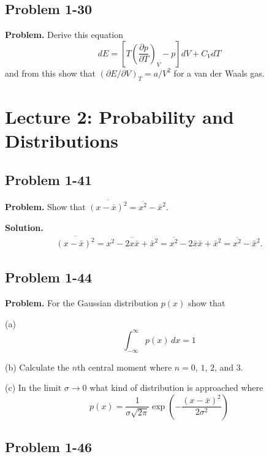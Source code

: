 \documentclass[twocolumn, 10pt]{article}
\numberwithin{equation}{section}
\newenvironment{problem}
{\par\medskip\sffamily \color{problue}
  \textbf{Problem. }\ignorespaces}
{\medskip}
\newenvironment{solution}
{\par\medskip
  \textbf{Solution. }\ignorespaces}
{\medskip}
\begin{document}
\subsection{Problem 1-30}

\begin{problem}
  Derive this equation
  $$
  dE = \left[ T \left( \frac{ \partial p} {\partial T } \right)_V - p \right]
  dV + C_V dT
  $$
  and from this show that $(\partial E/\partial V)_T = a/V^2$
  for a van der Waals gas.
\end{problem}

\section{Lecture 2: Probability and Distributions}

\subsection{Problem 1-41}

\begin{problem}
  Show that $\overline{ (x - \bar x)^2 } = \overline{ x^2 } - \bar x^2$.
\end{problem}

\begin{solution}
\begin{align*}
  \overline{ (x - \bar x)^2 }
  =
  \overline{ x^2  - 2 x \bar x + {\bar x}^2 }
  =
  \overline{ x^2 } - 2 \bar x \bar x + {\bar x}^2
  =
  \overline{ x^2 }  - {\bar x}^2.
\end{align*}
\end{solution}

\subsection{Problem 1-44}

\begin{problem}
  For the Gaussian distribution $p(x)$ show that

  (a)
  $$\int_{-\infty}^\infty p(x) \, dx  = 1$$

  (b)
  Calculate the $n$th central moment
  where $n = 0$, $1$, $2$, and $3$.

  (c)
  In the limit $\sigma \to 0$
  what kind of distribution is approached where
  $$
  p(x) = \frac{1}{\sigma \sqrt{2\pi}}
  \exp\left( -\frac{ (x -\bar x)^2 } { 2 \sigma^2} \right)
  $$
\end{problem}

\subsection{Problem 1-46}
\end{document}
